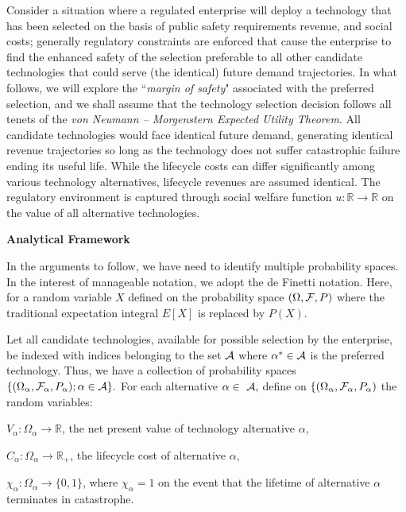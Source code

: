 \documentclass[12pt]{article}
\begin{document}
Consider a situation where a regulated enterprise will deploy a technology that has been selected on the basis of public safety requirements revenue, and social costs; generally regulatory constraints are enforced that cause the enterprise to find the enhanced safety of the selection preferable to all other candidate technologies that could serve (the identical) future demand trajectories. In what follows, we will explore the ``\emph{margin of safety}" associated with the preferred selection, and we shall assume that the technology selection decision follows all tenets of the \emph{von Neumann -- Morgenstern Expected Utility Theorem}. All candidate technologies would face identical future demand, generating identical revenue trajectories so long as the technology does not suffer catastrophic failure ending its useful life.  While the lifecycle costs can differ significantly among various technology alternatives, lifecycle revenues are assumed identical. The regulatory environment is captured through social welfare function $u: \mathbb{R} \rightarrow \mathbb{R}$ on the value of all alternative technologies.
\bigskip

\noindent
\textbf{Analytical Framework}

In the arguments to follow, we have need to identify multiple probability spaces. In the interest of manageable notation, we adopt the de Finetti notation.  Here, for a random variable $X$ defined on the probability space $(\Omega, {\cal{F}}, P)$ where the traditional expectation integral $E[X]$ is replaced by $P(X)$.

Let all candidate technologies, available for possible selection by the enterprise, be indexed with indices belonging to the set ${\cal{A}}$ where
 $\alpha^* \in {\cal{A}}$ is the preferred technology. Thus, we have a collection of probability spaces $\{(\Omega_\alpha, {\cal{F}}_\alpha, P_\alpha);  \alpha \in {\cal{A}}\}.$  For each alternative $\alpha \in \ {\cal{A}},$ define on $\{(\Omega_\alpha, {\cal{F}}_\alpha, P_\alpha)$ the random variables:
 
 $V_\alpha: \Omega_\alpha \rightarrow  \mathbb{R}$, the net present value of technology alternative $\alpha$,
 
 $C_\alpha: \Omega_\alpha \rightarrow  \mathbb{R}_+$, the lifecycle cost of alternative $\alpha$,
 
 $\chi_\alpha: \Omega_\alpha \rightarrow  \{0, 1\}$, where $\chi_\alpha = 1$ on the event that the lifetime of alternative $\alpha$ terminates in catastrophe.
 
\end{document}

